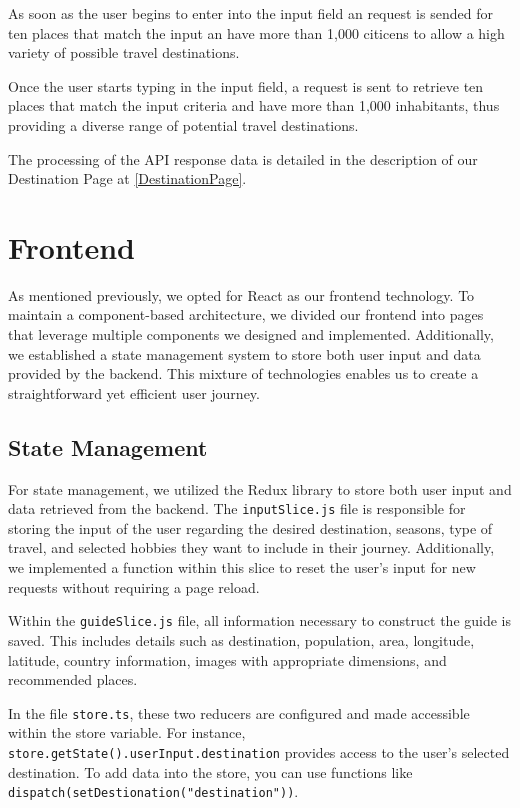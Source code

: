 \documentclass[english,notitlepage,smartquotes]{hgbreport}
\begin{document}
As soon as the user begins to enter into the input field an request is sended for ten places that match the input an have more than 1,000 citicens to allow a high variety of possible travel destinations. 

Once the user starts typing in the input field, a request is sent to retrieve ten places that match the input criteria and have more than 1,000 inhabitants, thus providing a diverse range of potential travel destinations.

The processing of the API response data is detailed in the description of our Destination Page at \ref{DestinationPage}.

\section{Frontend}

As mentioned previously, we opted for React as our frontend technology. To maintain a component-based architecture, we divided our frontend into pages that leverage multiple components we designed and implemented. Additionally, we established a state management system to store both user input and data provided by the backend. This mixture of technologies enables us to create a straightforward yet efficient user journey.

\subsection{State Management}
For state management, we utilized the Redux library to store both user input and data retrieved from the backend. The  \texttt{inputSlice.js} file is responsible for storing the input of the user regarding the desired destination, seasons, type of travel, and selected hobbies they want to include in their journey. Additionally, we implemented a function within this slice to reset the user's input for new requests without requiring a page reload.

Within the \texttt{guideSlice.js} file, all information necessary to construct the guide is saved. This includes details such as destination, population, area, longitude, latitude, country information, images with appropriate dimensions, and recommended places.

In the file \texttt{store.ts}, these two reducers are configured and made accessible within the store variable. For instance, \texttt{store.getState().userInput.destination} provides access to the user's selected destination. To add data into the store, you can use functions like  \texttt{dispatch(setDestionation("destination"))}.
\end{document}
